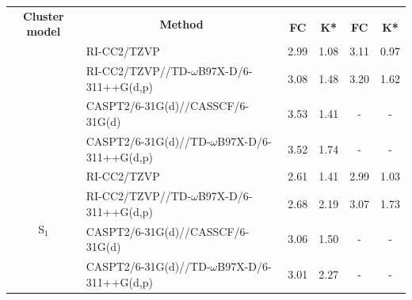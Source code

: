 \begin{table}[H]
\centering
\small
{}
\label{tab:em_abs_cas}
\begin{tabular}{@{}cp{8cm}cccc@{}}

\toprule
\multirow{2}{*}{\textbf{Cluster model}}& \multicolumn{1}{c}{\multirow{2}{*}{\textbf{Method}}}& \multicolumn{2}{c}{\HC{}}                 & \multicolumn{2}{c}{\HCC{}}   \\ \cmidrule(lr){3-4} \cmidrule(lr){5-6}
& & \multicolumn{1}{c}{\textbf{FC}}               & \multicolumn{1}{c}{\textbf{K*}}           & \multicolumn{1}{c}{\textbf{FC}}          & \multicolumn{1}{c}{\textbf{K*}}              \\ \midrule
\multirow{4}{*}{\EEC{}}&RI-CC2\slash{}TZVP
& 2.99  & 1.08 & 3.11 & 0.97 \\
&RI-CC2\slash{}TZVP\slash{}\slash{}TD-$\omega$B97X-D\slash{}6-311++G(d,p)
& 3.08 & 1.48 & 3.20 & 1.62 \\
&CASPT2\slash{}6-31G(d)\slash{}\slash{}CASSCF\slash{}6-31G(d)
& 3.53 & 1.41 & - & - \\
&CASPT2\slash{}6-31G(d)\slash{}\slash{}TD-$\omega$B97X-D\slash{}6-311++G(d,p)
& 3.52 & 1.74 & - & - \\\midrule

\multirow{4}{*}{\SCEEC{} S$_1$} & RI-CC2\slash{}TZVP
& 2.61 & 1.41 & 2.99 & 1.03 \\
&RI-CC2\slash{}TZVP\slash{}\slash{}TD-$\omega$B97X-D\slash{}6-311++G(d,p)
& 2.68 & 2.19 & 3.07 & 1.73 \\
&CASPT2\slash{}6-31G(d)\slash{}\slash{}CASSCF\slash{}6-31G(d)
& 3.06 & 1.50 & - & -\\
&CASPT2\slash{}6-31G(d)\slash{}\slash{}TD-$\omega$B97X-D\slash{}6-311++G(d,p)
& 3.01 & 2.27 & - & - \\\midrule

\bottomrule
\end{tabular}
\end{table}
